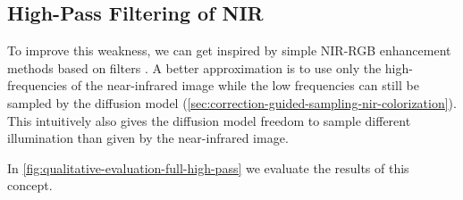 \subsection{High-Pass Filtering of NIR}
\label{sec:high-pass-filter-evaluation}

To improve this weakness, we can get inspired by simple NIR-RGB enhancement methods based on filters \parencite{rgb-nir-image-enhancement}.
A better approximation is to use only the high-frequencies of the near-infrared image while the low frequencies can still be sampled by the diffusion model (\autoref{sec:correction-guided-sampling-nir-colorization}).
This intuitively also gives the diffusion model freedom to sample different illumination than given by the near-infrared image.

In \autoref{fig:qualitative-evaluation-full-high-pass} we evaluate the results of this concept.

